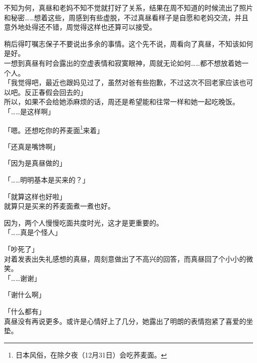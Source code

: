 不知为何，真昼和老妈不知不觉就打好了关系，结果在周不知道的时候流出了照片和秘密……想着这些，周感到有些虚脱，不过真昼看样子是自愿和老妈交流，并且意外地处得还不错，周觉得这样也还算可以接受。

稍后得叮嘱志保子不要说出多余的事情。这个先不说，周看向了真昼，不知该如何是好。\\

一想到真昼有时会露出的空虚表情和寂寞眼神，周就无论如何……都不想放着她一个人。\\

「我觉得吧，最近也跟妈见过了，虽然对爸有些抱歉，不过这次不回老家应该也可以吧。反正春假会回去的」\\

所以，如果不会给她添麻烦的话，周还是希望能和往常一样和她一起吃晚饭。\\

「……是这样啊」

「嗯。还想吃你的荞麦面\footnote{日本风俗，在除夕夜（12月31日）会吃荞麦面。}来着」

「还真是嘴馋啊」

「因为是真昼做的」

「……明明基本是买来的？」

「就算这样也好啦」\\

就算只是买来的荞麦面煮一煮也好。

因为，两个人慢慢吃面共度时光，这才是更重要的。\\

「……真是个怪人」

「吵死了」\\

对着发表出失礼感想的真昼，周刻意做出了不高兴的回答，而真昼回了个小小的微笑。\\

「……谢谢」

「谢什么啊」

「什么都有」\\

真昼没有再说更多。或许是心情好上了几分，她露出了明朗的表情抱紧了喜爱的坐垫。
